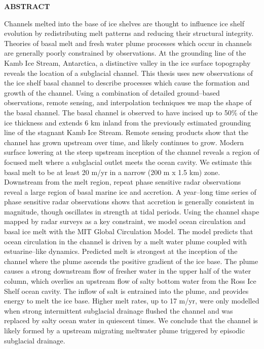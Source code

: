 \newpage
{}



\begin{center}
\textbf{ABSTRACT}
\end{center}
Channels melted into the base of ice shelves are thought to influence ice shelf evolution by redistributing melt patterns and reducing their structural integrity. Theories of basal melt and fresh water plume processes which occur in channels are generally poorly constrained by observations.
At the grounding line of the Kamb Ice Stream, Antarctica, a distinctive valley in the ice surface topography reveals the location of a subglacial channel.
This thesis uses new observations of the ice shelf basal channel to describe processes which cause the formation and growth of the channel. 
Using a combination of detailed ground--based observations, remote sensing, and interpolation techniques we map the shape of the basal channel.
The basal channel is observed to have incised up to 50\% of the ice thickness and extends 6 km inland from the previously estimated grounding line of the stagnant Kamb Ice Stream.
Remote sensing products show that the channel has grown upstream over time, and likely continues to grow. Modern surface lowering at the steep upstream inception of the channel reveals a region of focused melt where a subglacial outlet meets the ocean cavity. We estimate this basal melt to be at least 20 m/yr in a narrow (200 m x 1.5 km) zone. Downstream from the melt region, repeat phase sensitive radar observations reveal a large region of basal marine ice and accretion. A year--long time series of phase sensitive radar observations shows that accretion is generally consistent in magnitude, though oscillates in strength at tidal periods.
Using the channel shape mapped by radar surveys as a key constraint, we model ocean circulation and basal ice melt with the MIT Global Circulation Model. The model predicts that ocean circulation in the channel is driven by a melt water plume coupled with  estuarine--like dynamics.
Predicted melt is strongest at the inception of the channel where the plume ascends the positive gradient of the ice base. The plume causes a strong downstream flow of fresher water in the upper half of the water column, which overlies an upstream flow of salty bottom water from the Ross Ice Shelf ocean cavity. The inflow of salt is entrained into the plume, and provides energy to melt the ice base.
Higher melt rates, up to 17 m/yr, were only modelled when strong intermittent subglacial drainage flushed the channel and was replaced by salty ocean water in quiescent times. 
We conclude that the channel is likely formed by a upstream migrating meltwater plume triggered by episodic subglacial drainage. 





